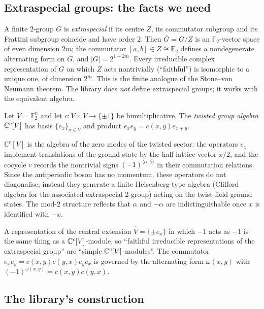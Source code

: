 \subsection{Extraspecial groups: the facts we need}

A finite $2$-group $G$ is \emph{extraspecial} if its centre $Z$, its commutator subgroup and its
Frattini subgroup coincide and have order $2$.  Then $\bar G=G/Z$ is an $\mathbb F_2$-vector space
of even dimension $2m$; the commutator $[a,b]\in Z\cong\mathbb F_2$ defines a nondegenerate
alternating form on $\bar G$, and $|G|=2^{1+2m}$.  Every irreducible complex representation of $G$
on which $Z$ acts nontrivially (``faithful'') is isomorphic to a unique one, of dimension $2^m$.
This is the finite analogue of the Stone--von Neumann theorem.  The library does \emph{not} define
extraspecial groups; it works with the equivalent algebra.

\begin{definition}\label{ch06:def:twga}
Let $V=\mathbb F_2^n$ and let $c:V\times V\to\{\pm1\}$ be bimultiplicative.  The \emph{twisted group
algebra} ${\mathbb{C}}^c[V]$ has basis $\{e_x\}_{x\in V}$ and product $e_xe_y=c(x,y)e_{x+y}$.
\end{definition}

\begin{physics}
$\mathbb C^c[V]$ is the algebra of the zero modes of the twisted sector: the operators $e_x$ implement translations of the ground state by the half-lattice vector $x/2$, and the cocycle $c$ records the nontrivial signs $(-1)^{\langle\alpha,\beta\rangle}$ in their commutation relations. Since the antiperiodic boson has no momentum, these operators do not diagonalise; instead they generate a finite Heisenberg-type algebra (Clifford algebra for the associated extraspecial $2$-group) acting on the twist-field ground states. The mod-$2$ structure reflects that $\alpha$ and $-\alpha$ are indistinguishable once $x$ is identified with $-x$.
\end{physics}
A representation of the central extension $\hat V=\{\pm e_x\}$ in which $-1$ acts as $-1$ is the
same thing as a ${\mathbb{C}}^c[V]$-module, so ``faithful irreducible representations of the extraspecial
group'' are ``simple ${\mathbb{C}}^c[V]$-modules''.  The commutator $e_xe_y=c(x,y)c(y,x)e_ye_x$ is governed by
the alternating form $\omega(x,y)$ with $(-1)^{\omega(x,y)}=c(x,y)c(y,x)$.

\subsection{The library's construction}

